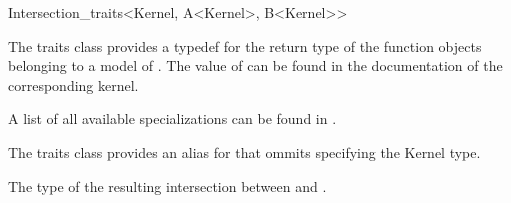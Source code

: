 \begin{ccRefClass}{Intersection_traits<Kernel, A<Kernel>, B<Kernel>>}


\ccDefinition

The traits class \ccClassTemplateName provides a typedef for the
return type of the  function objects belonging to a
model of . The value of  can be found
in the  documentation of the corresponding kernel.

A list of all available specializations can be found in .

The traits class  provides an alias for
\ccClassTemplateName that ommits specifying the Kernel type.

\ccTypes

 The type of the resulting intersection between  and .

\ccSeeAlso
{}

\end{ccRefClass}
